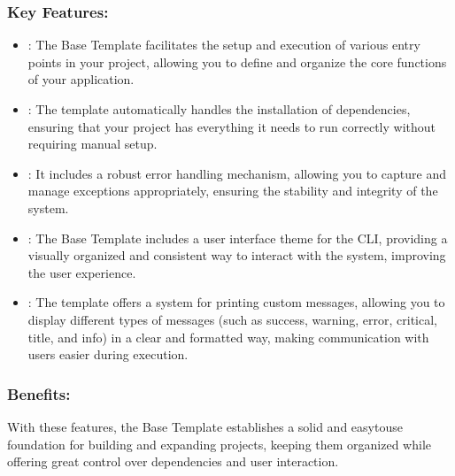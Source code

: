 \documentclass[letterpaper,10pt,english]{sphinxhowto}
\begin{document}
\subsubsection{Key Features:}
\label{\detokenize{templates/base/index:key-features}}\begin{itemize}
\item {} 
\sphinxAtStartPar
{}: The Base Template facilitates the setup and execution of various entry points in your project, allowing you to define and organize the core functions of your application.

\item {} 
\sphinxAtStartPar
{}: The template automatically handles the installation of dependencies, ensuring that your project has everything it needs to run correctly without requiring manual setup.

\item {} 
\sphinxAtStartPar
{}: It includes a robust error handling mechanism, allowing you to capture and manage exceptions appropriately, ensuring the stability and integrity of the system.

\item {} 
\sphinxAtStartPar
{}: The Base Template includes a user interface theme for the CLI, providing a visually organized and consistent way to interact with the system, improving the user experience.

\item {} 
\sphinxAtStartPar
{}: The template offers a system for printing custom messages, allowing you to display different types of messages (such as success, warning, error, critical, title, and info) in a clear and formatted way, making communication with users easier during execution.

\end{itemize}


\subsubsection{Benefits:}
\label{\detokenize{templates/base/index:benefits}}
\sphinxAtStartPar
With these features, the Base Template establishes a solid and easy\sphinxhyphen{}to\sphinxhyphen{}use foundation for building and expanding projects, keeping them organized while offering great control over dependencies and user interaction.
\end{document}
